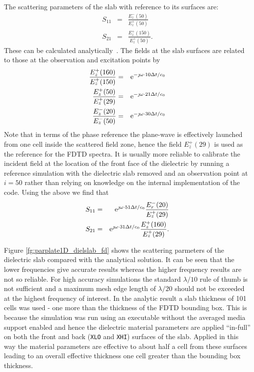 \documentclass[onecolumn,a4paper]{article}
\numberwithin{equation}{section}
\begin{document}
The scattering parameters of the slab with reference to its surfaces are:
\begin{eqnarray}
S_{11} &=& \frac{E^-_z(50)}{E^+_z(50)} \\
S_{21} &=& \frac{E^+_z(150)}{E^+_z(50)}.
\end{eqnarray}
These can be calculated analytically~\cite{Orfanidis2010}. The fields at the slab surfaces are related to those at the observation and excitation points by
\begin{eqnarray}
\frac{E^+_z(160)}{E^+_z(150)} &=& \mathrm{e}^{ -\jmath \omega \cdot 10 \Delta t / c_0} \\
\frac{E^+_z(50)}{E^+_z(29)} &=& \mathrm{e}^{ -\jmath \omega \cdot 21 \Delta t / c_0} \\
\frac{E^-_z(20)}{E^-_z(50)} &=& \mathrm{e}^{ -\jmath \omega \cdot 30 \Delta t / c_0}
\end{eqnarray}
Note that in terms of the phase reference the plane-wave is effectively launched from one cell inside the
scattered field zone, hence the field $E^+_z(29)$ is used as the reference for the FDTD spectra. It
is usually more reliable to calibrate the incident field at the location of the front face of the 
dielectric by running a reference simulation with the dielectric slab removed and an observation
point at $i=50$ rather than relying on knowledge on the internal implementation of the code. Using the above we find that
\begin{eqnarray}
S_{11} &=& \mathrm{e}^{ \jmath \omega \cdot 51 \Delta t / c_0} \frac{E^-_r(20)}{E^+_z(29)} \\
S_{21} &=& \mathrm{e}^{ \jmath \omega \cdot 31 \Delta t / c_0} \frac{E^+_z(160)}{E^+_z(29)}.
\end{eqnarray}

Figure \ref{fg:parplate1D_dielslab_fd} shows the scattering parmeters of the dielectric slab compared with the analytical solution. 
It can be seen that the lower frequencies give accurate results whereas the higher frequency 
results are not so reliable. For high accuracy simulations the standard $\lambda/10$ rule of thumb is not
sufficient and a maximum mesh edge length of $\lambda/20$ should not be exceeded at the highest frequency of 
interest. In the analytic result a slab thickness of 101 cells was used - one more than
the thickness of the FDTD bounding box. This is because the simulation was run using an executable without
the averaged media support enabled and hence the dielectric material parameters are applied ``in-full'' on 
both the front and back (\texttt{XLO} and \texttt{XHI}) surfaces of the slab. Applied in this way the 
material parameters are effective to about half a cell from these surfaces leading to an overall
effective thickness one cell greater than the bounding box thickness.
\end{document}
